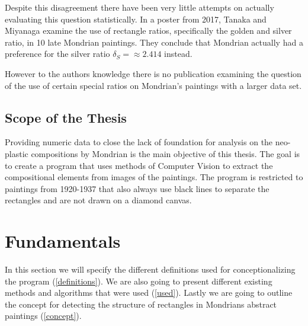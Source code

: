 \documentclass[serif,article,noparskip]{agse-thesis}
\begin{document}
Despite this disagreement there have been very little attempts on actually
evaluating this question statistically. In a poster from 2017, Tanaka and
Miyanaga \cite{Tanaka2017} examine the use of rectangle ratios, specifically the
golden and silver ratio, in 10 late Mondrian paintings. They conclude that
Mondrian actually had a preference for the silver ratio $\delta_S = \approx 2.414$ instead.

However to the authors knowledge there is no publication examining the question of
the use of certain special ratios on Mondrian's paintings with a larger data
set.


\subsection{Scope of the Thesis}

Providing numeric data to close the lack of foundation for analysis on the
neo-plastic compositions by Mondrian is the main objective of this thesis. The
goal is to create a program that uses methods of Computer Vision to extract the
compositional elements from images of the paintings. The program is restricted
to paintings from 1920-1937 that also always use black lines to separate the
rectangles and are not drawn on a diamond canvas.


\section{Fundamentals} \label{fundamentals}

In this section we will specify the different definitions used for
conceptionalizing the program (\ref{definitions}). We are also going to present
different existing methods and algorithms that were used (\ref{used}).
Lastly we are going to outline the concept for detecting the structure of rectangles
in Mondrians abstract paintings (\ref{concept}).
\end{document}
